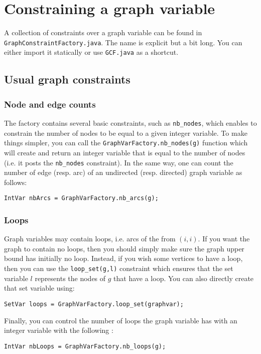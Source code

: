 \documentclass{article}
\begin{document}
\newpage{}
\section{Constraining a graph variable}

A collection of constraints over a graph variable can be found in \texttt{GraphConstraintFactory.java}. 
The name is explicit but a bit long. You can either import it statically or use \texttt{GCF.java} as a shortcut. 

\subsection{Usual graph constraints}

\subsubsection{Node and edge counts}

The factory contains several basic constraints, such as \texttt{nb\_nodes}, which enables to constrain the number of nodes to be equal to a given integer variable. 
To make things simpler, you can call the \texttt{GraphVarFactory.nb\_nodes(g)} function which will create and return an integer variable that is equal to the number of nodes (i.e. it posts the \texttt{nb\_nodes} constraint). 
In the same way, one can count the number of edge (resp. arc) of an undirected (resp. directed) graph variable as follows: 
\begin{lstlisting}
IntVar nbArcs = GraphVarFactory.nb_arcs(g);
\end{lstlisting}  

\subsubsection{Loops}

Graph variables may contain loops, i.e. arcs of the from $(i,i)$. If you want the graph to contain no loops, then you should simply make sure the graph upper bound has initially no loop. Instead, if you wish some vertices to have a loop, then you can use the \texttt{loop\_set(g,l)} constraint which ensures that the set variable $l$ represents the nodes of $g$ that have a loop. You can also directly create that set variable using:
\begin{lstlisting}
SetVar loops = GraphVarFactory.loop_set(graphvar);
\end{lstlisting} 

Finally, you can control the number of loops the graph variable has with an integer variable with the following : 
\begin{lstlisting}
IntVar nbLoops = GraphVarFactory.nb_loops(g);
\end{lstlisting} 
\end{document}
